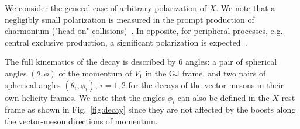 \documentclass[prd,preprintnumbers,floatfix,
nofootinbib,superscriptaddress]{revtex4}
\begin{document}
We consider the general case of arbitrary polarization of $X$.
We note that a negligibly small polarization is measured in the prompt production of charmonium ("head on" collisions)~\cite{Aaij:2013nlm,Chatrchyan:2012woa,CDF:2011ag, Aaij:2013oxa,Sirunyan:2018bfd}.
In opposite, for peripheral processes, e.g. central exclusive production, a significant polarization is expected~\cite{Pasechnik:2010pq}.

The full kinematics of the decay is described by 6 angles: a pair of spherical angles $(\theta,\phi)$ of the momentum of $V_1$ in the GJ frame, and two pairs of spherical angles $(\theta_i,\phi_i)$, $i=1,2$ for the decays of the vector mesons in their own helicity frames.
We note that the angles $\phi_i$ can also be defined in the $X$ rest frame as shown in Fig.~\ref{fig:decay} since they are not affected by the boosts along the vector-meson directions of momentum.
\end{document}
